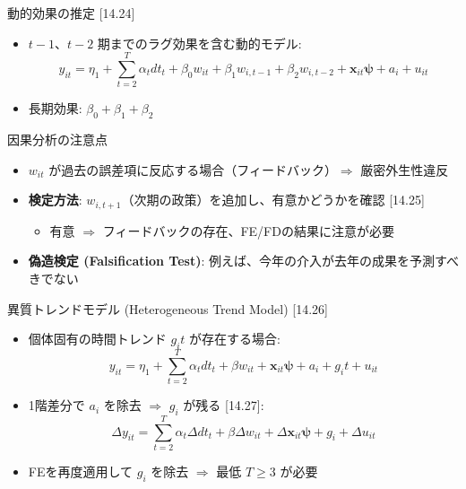 \documentclass[
  ignorenonframetext,
]{beamer}
\providecommand{\tightlist}{%
  \setlength{\itemsep}{0pt}\setlength{\parskip}{0pt}}
\begin{document}
\begin{frame}{動的効果の推定 {[}14.24{]}}
\label{ux52d5ux7684ux52b9ux679cux306eux63a8ux5b9a-14.24}
\begin{itemize}
\tightlist
\item
  \(t-1\)、\(t-2\) 期までのラグ効果を含む動的モデル:
  \[y_{it} = \eta_1 + \sum_{t=2}^{T}\alpha_t dt_t + \beta_0 w_{it} + \beta_1 w_{i,t-1} + \beta_2 w_{i,t-2} + \mathbf{x}_{it}\boldsymbol{\psi} + a_i + u_{it}\]
\item
  長期効果: \(\beta_0 + \beta_1 + \beta_2\)
\end{itemize}
\end{frame}

\begin{frame}{因果分析の注意点}
\label{ux56e0ux679cux5206ux6790ux306eux6ce8ux610fux70b9}
\begin{itemize}
\tightlist
\item
  \(w_{it}\)
  が過去の誤差項に反応する場合（フィードバック）\(\Rightarrow\)
  厳密外生性違反
\item
  \textbf{検定方法}:
  \(w_{i,t+1}\)（次期の政策）を追加し、有意かどうかを確認 {[}14.25{]}

  \begin{itemize}
  \tightlist
  \item
    有意 \(\Rightarrow\) フィードバックの存在、FE/FDの結果に注意が必要
  \end{itemize}
\item
  \textbf{偽造検定 (Falsification Test)}:
  例えば、今年の介入が去年の成果を予測すべきでない
\end{itemize}
\end{frame}

\begin{frame}{異質トレンドモデル (Heterogeneous Trend Model)
{[}14.26{]}}
\label{ux7570ux8ceaux30c8ux30ecux30f3ux30c9ux30e2ux30c7ux30eb-heterogeneous-trend-model-14.26}
\begin{itemize}
\tightlist
\item
  個体固有の時間トレンド \(g_i t\) が存在する場合:
  \[y_{it} = \eta_1 + \sum_{t=2}^T \alpha_t dt_t + \beta w_{it} + \mathbf{x}_{it}\boldsymbol{\psi} + a_i + g_i t + u_{it}\]
\item
  1階差分で \(a_i\) を除去 \(\Rightarrow\) \(g_i\) が残る {[}14.27{]}:
  \[\Delta y_{it} = \sum_{t=2}^T \alpha_t \Delta dt_t + \beta \Delta w_{it} + \Delta\mathbf{x}_{it}\boldsymbol{\psi} + g_i + \Delta u_{it}\]
\item
  FEを再度適用して \(g_i\) を除去 \(\Rightarrow\) 最低 \(T \geq 3\)
  が必要
\end{itemize}
\end{frame}
\end{document}
